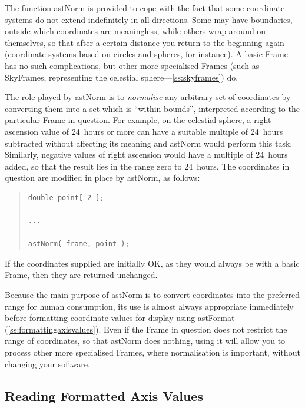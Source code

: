 \documentclass[twoside,11pt]{article}
\newcommand{\htmlref}[2]{#1}
\newcommand{\secref}[1]{\S\ref{#1}}
\renewcommand{\secref}[1]{\ref{#1}}
\begin{document}
The function \htmlref{astNorm}{astNorm} is provided to cope with the fact that some
coordinate systems do not extend indefinitely in all directions. Some
may have boundaries, outside which coordinates are meaningless, while
others wrap around on themselves, so that after a certain distance you
return to the beginning again (coordinate systems based on circles and
spheres, for instance). A basic \htmlref{Frame}{Frame} has no such complications, but
other more specialised Frames (such as SkyFrames, representing the
celestial sphere---\secref{ss:skyframes}) do.

The role played by astNorm is to {\em{normalise}} any arbitrary set of
coordinates by converting them into a set which is ``within bounds'',
interpreted according to the particular Frame in question. For
example, on the celestial sphere, a right ascension value of 24~hours
or more can have a suitable multiple of 24~hours subtracted without
affecting its meaning and astNorm would perform this task. Similarly,
negative values of right ascension would have a multiple of 24~hours
added, so that the result lies in the range zero to 24~hours. The
coordinates in question are modified in place by astNorm, as follows:

\begin{quote}
\small
\begin{verbatim}
double point[ 2 ];

...

astNorm( frame, point );
\end{verbatim}
\normalsize
\end{quote}

If the coordinates supplied are initially OK, as they would always be
with a basic Frame, then they are returned unchanged.

Because the main purpose of astNorm is to convert coordinates into the
preferred range for human consumption, its use is almost always
appropriate immediately before formatting coordinate values for
display using \htmlref{astFormat}{astFormat} (\secref{ss:formattingaxisvalues}). Even if
the Frame in question does not restrict the range of coordinates, so
that astNorm does nothing, using it will allow you to process other
more specialised Frames, where normalisation is important, without
changing your software.

\subsection{\label{ss:unformattingaxisvalues}Reading Formatted Axis Values}
\end{document}
